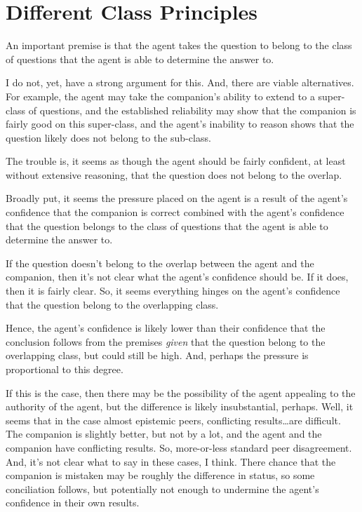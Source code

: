 \documentclass[10pt]{article}
\begin{document}
\section{Different Class Principles}
\label{sec:diff-class-princ}

An important premise is that the agent takes the question to belong to the class of questions that the agent is able to determine the answer to.

I do not, yet, have a strong argument for this.
And, there are viable alternatives.
For example, the agent may take the companion's ability to extend to a super-class of questions, and the established reliability may show that the companion is fairly good on this super-class, and the agent's inability to reason shows that the question likely does not belong to the sub-class.

The trouble is, it seems as though the agent should be fairly confident, at least without extensive reasoning, that the question does not belong to the overlap.

Broadly put, it seems the pressure placed on the agent is a result of the agent's confidence that the companion is correct combined with the agent's confidence that the question belongs to the class of questions that the agent is able to determine the answer to.

If the question doesn't belong to the overlap between the agent and the companion, then it's not clear what the agent's confidence should be.
If it does, then it is fairly clear.
So, it seems everything hinges on the agent's confidence that the question belong to the overlapping class.

Hence, the agent's confidence is likely lower than their confidence that the conclusion follows from the premises \emph{given} that the question belong to the overlapping class, but could still be high.
And, perhaps the pressure is proportional to this degree.

If this is the case, then there may be the possibility of the agent appealing to the authority of the agent, but the difference is likely insubstantial, perhaps.
Well, it seems that in the case almost epistemic peers, conflicting results\dots are difficult.
The companion is slightly better, but not by a lot, and the agent and the companion have conflicting results.
So, more-or-less standard peer disagreement.
And, it's not clear what to say in these cases, I think.
There chance that the companion is mistaken may be roughly the difference in status, so some conciliation follows, but potentially not enough to undermine the agent's confidence in their own results.
\end{document}
